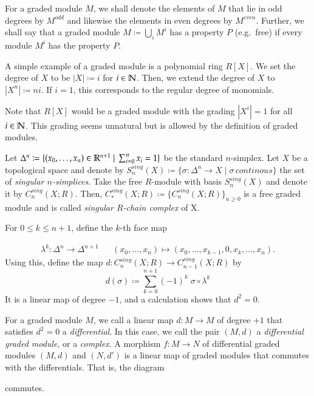 For a graded module $M$, we shall denote the elements of $M$ that lie in odd degrees by $M^{odd}$ and 
likewise the elements in even degrees by $M^{even}$.
Further, we shall say that a graded module $M \coloneqq \bigcup_i M^i$ has a property $P$ (e.g.\ free) if every module $M^i$ has the property $P$.
 
\begin{Example}
\label{ex:PolynomialRingGradedModule}
 A simple example of a graded module is a polynomial ring $R[X]$. We set the degree of $X$ to be $|X| \coloneqq i$ for $i \in \mathbb{N}$.
 Then, we extend the degree of $X$ to $|X^n| \coloneqq n i$. If $i = 1$, this corresponds to the regular degree of monomials.
 
 Note that $R[X]$ would be a graded module with the grading $|X^i| = 1$ for all $i \in \mathbb{N}$. This grading 
 seems unnatural but is allowed by the definition of graded modules.
\end{Example}
 
 
\begin{Example}
\label{ex:SingularChainComplex}
 Let $\Delta^n \coloneqq \lbrace (x_0, \dotsc , x_n) \in \mathbb{R}^{n+1} \; | \; \sum_{i = 0}^n x_i = 1\rbrace$ be the standard
 $n$-simplex. Let $X$ be a topological space and denote by
 $S_n^{sing}(X) \coloneqq \lbrace \sigma \colon \Delta^n \to X \; | \; \sigma \, continous \rbrace$ the set of
 \emph{singular $n$-simplices}. 
 Take the free $R$-module with basis $S_n^{sing}(X)$ 
 and denote it by $C_n^{sing}(X;R)$.
 Then, $ C_*^{sing}(X;R) \coloneqq {\lbrace C_n^{sing}(X;R)\rbrace}_{n \geq 0}$ is a free graded module and is called 
 \emph{singular $R$-chain complex} of X. 
 
 For $0 \leq k \leq n+1$, define the $k$-th face map
 
 \begin{align*}
 \lambda^k \colon \Delta^{n} \to \Delta^{n+1}&  &
 (x_0, \dotsc, x_n) \mapsto (x_0, \dotsc, x_{k-1},0, x_k, \dotsc, x_n).
 \end{align*}
 Using this, define the map $d \colon C_n^{sing}(X;R) \to C_{n-1}^{sing}(X;R)$ by
 $$ d(\sigma) \coloneqq \sum_{k = 0}^{n+1} (-1)^k \; \sigma \circ \lambda^k$$
 It is a linear map of degree $-1$, and a calculation shows that $d^2 = 0$.
 \end{Example}

\begin{Definition}

For a graded module $M$, we call a linear map $d \colon M \to M$ of degree $+1$ that satisfies $ d^2 = 0$ a \emph{differential}.
In this case, we call the pair $(M , d)$ a \emph{differential graded module}, or a \emph{complex}.
A morphism $f \colon M \to N$ of differential graded modules $(M,d)$ and $(N,d')$ is a linear map of graded modules that commutes with the 
differentials. That is, the diagram

\centerline{
}
commutes.
\end{Definition}

